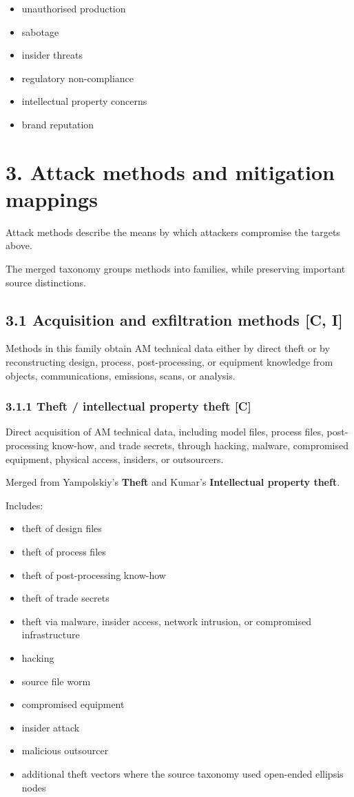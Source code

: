 \documentclass[10pt,a4paper,oneside]{report}
\begin{document}
\begin{itemize}
\item unauthorised production
\item sabotage
\item insider threats
\item regulatory non-compliance
\item intellectual property concerns
\item brand reputation
\end{itemize}


\chapter{3. Attack methods and mitigation mappings}


Attack methods describe the means by which attackers compromise the targets above.

The merged taxonomy groups methods into families, while preserving important source distinctions.


\section{3.1 Acquisition and exfiltration methods [C, I]}


Methods in this family obtain AM technical data either by direct theft or by reconstructing design, process, post-processing, or equipment knowledge from objects, communications, emissions, scans, or analysis.


\subsection{3.1.1 Theft / intellectual property theft [C]}


Direct acquisition of AM technical data, including model files, process files, post-processing know-how, and trade secrets, through hacking, malware, compromised equipment, physical access, insiders, or outsourcers.

Merged from Yampolskiy's \textbf{Theft} and Kumar's \textbf{Intellectual property theft}.

Includes:

\begin{itemize}
\item theft of design files
\item theft of process files
\item theft of post-processing know-how
\item theft of trade secrets
\item theft via malware, insider access, network intrusion, or compromised infrastructure
\item hacking
\item source file worm
\item compromised equipment
\item insider attack
\item malicious outsourcer
\item additional theft vectors where the source taxonomy used open-ended ellipsis nodes
\end{itemize}
\end{document}
